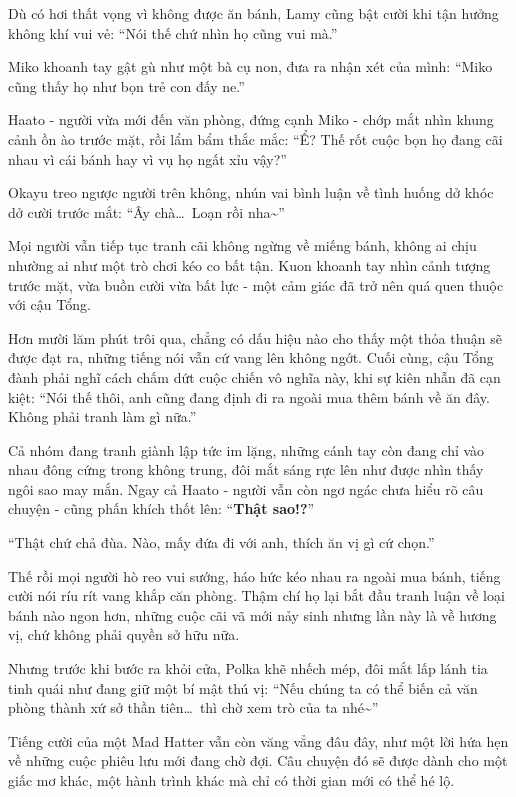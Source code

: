 \documentclass[../main.tex]{subfiles}
\begin{document}
Dù có hơi thất vọng vì không được ăn bánh, Lamy cũng bật cười khi tận hưởng không khí vui vẻ: ``Nói thế chứ nhìn họ cũng vui mà.''

Miko khoanh tay gật gù như một bà cụ non, đưa ra nhận xét của mình: ``Miko cũng thấy họ như bọn trẻ con đấy ne.''

Haato - người vừa mới đến văn phòng, đứng cạnh Miko - chớp mắt nhìn khung cảnh ồn ào trước mặt, rồi lẩm bẩm thắc mắc: ``Ể? Thế rốt cuộc bọn họ đang cãi nhau vì cái bánh hay vì vụ họ ngất xỉu vậy?''

Okayu treo ngược người trên không, nhún vai bình luận về tình huống dở khóc dở cười trước mắt: ``Ây chà\dots\ Loạn rồi nha\~{}''

Mọi người vẫn tiếp tục tranh cãi không ngừng về miếng bánh, không ai chịu nhường ai như một trò chơi kéo co bất tận. Kuon khoanh tay nhìn cảnh tượng trước mặt, vừa buồn cười vừa bất lực - một cảm giác đã trở nên quá quen thuộc với cậu Tổng.

Hơn mười lăm phút trôi qua, chẳng có dấu hiệu nào cho thấy một thỏa thuận sẽ được đạt ra, những tiếng nói vẫn cứ vang lên không ngớt. Cuối cùng, cậu Tổng đành phải nghĩ cách chấm dứt cuộc chiến vô nghĩa này, khi sự kiên nhẫn đã cạn kiệt: ``Nói thế thôi, anh cũng đang định đi ra ngoài mua thêm bánh về ăn đây. Không phải tranh làm gì nữa.''

Cả nhóm đang tranh giành lập tức im lặng, những cánh tay còn đang chỉ vào nhau đông cứng trong không trung, đôi mắt sáng rực lên như được nhìn thấy ngôi sao may mắn. Ngay cả Haato - người vẫn còn ngơ ngác chưa hiểu rõ câu chuyện - cũng phấn khích thốt lên: ``\textbf{Thật sao!?}''

``Thật chứ chả đùa. Nào, mấy đứa đi với anh, thích ăn vị gì cứ chọn.''

Thế rồi mọi người hò reo vui sướng, háo hức kéo nhau ra ngoài mua bánh, tiếng cười nói ríu rít vang khắp căn phòng. Thậm chí họ lại bắt đầu tranh luận về loại bánh nào ngon hơn, những cuộc cãi vã mới nảy sinh nhưng lần này là về hương vị, chứ không phải quyền sở hữu nữa.

Nhưng trước khi bước ra khỏi cửa, Polka khẽ nhếch mép, đôi mắt lấp lánh tia tinh quái như đang giữ một bí mật thú vị: ``Nếu chúng ta có thể biến cả văn phòng thành xứ sở thần tiên\dots\ thì chờ xem trò của ta nhé\~{}''

Tiếng cười của một Mad Hatter vẫn còn văng vẳng đâu đây, như một lời hứa hẹn về những cuộc phiêu lưu mới đang chờ đợi. Câu chuyện đó sẽ được dành cho một giấc mơ khác, một hành trình khác mà chỉ có thời gian mới có thể hé lộ.
\end{document}
